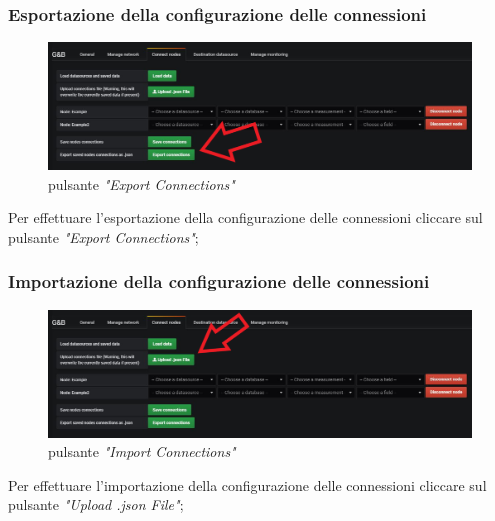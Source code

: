 \subsubsection{Esportazione della configurazione delle connessioni}
\begin{figure} [H]
	\centering
	\includegraphics[scale=0.53]{Img/export} 
	\caption{pulsante \emph{"Export Connections"}} \label{} 
\end{figure} 
Per effettuare l'esportazione della configurazione delle connessioni cliccare sul pulsante \emph{"Export Connections"};
\subsubsection{Importazione della configurazione delle connessioni}
\begin{figure} [H]
	\centering
	\includegraphics[scale=0.53]{Img/import} 
	\caption{pulsante \emph{"Import Connections"}} \label{} 
\end{figure} 
Per effettuare l'importazione della configurazione delle connessioni cliccare sul pulsante \emph{"Upload .json File"};